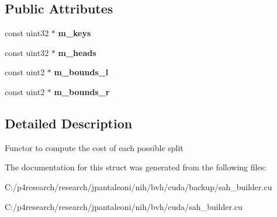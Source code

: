 \subsection*{\-Public \-Attributes}
\begin{DoxyCompactItemize}
\item 
\hypertarget{structnih_1_1cuda_1_1sah_1_1_cost__functor_a0342b4ecc5071a799c38c0c78210b16d}{
const uint32 $\ast$ {\bfseries m\-\_\-keys}}
\label{structnih_1_1cuda_1_1sah_1_1_cost__functor_a0342b4ecc5071a799c38c0c78210b16d}

\item 
\hypertarget{structnih_1_1cuda_1_1sah_1_1_cost__functor_a0d76a74ad352bc462b5e604b6560e917}{
const uint32 $\ast$ {\bfseries m\-\_\-heads}}
\label{structnih_1_1cuda_1_1sah_1_1_cost__functor_a0d76a74ad352bc462b5e604b6560e917}

\item 
\hypertarget{structnih_1_1cuda_1_1sah_1_1_cost__functor_ab0cd9dc0b011dd5689214b4d77c635a9}{
const uint2 $\ast$ {\bfseries m\-\_\-bounds\-\_\-l}}
\label{structnih_1_1cuda_1_1sah_1_1_cost__functor_ab0cd9dc0b011dd5689214b4d77c635a9}

\item 
\hypertarget{structnih_1_1cuda_1_1sah_1_1_cost__functor_ad345951b0d487eb2c5b05753bef1c7c9}{
const uint2 $\ast$ {\bfseries m\-\_\-bounds\-\_\-r}}
\label{structnih_1_1cuda_1_1sah_1_1_cost__functor_ad345951b0d487eb2c5b05753bef1c7c9}

\end{DoxyCompactItemize}


\subsection{\-Detailed \-Description}
\-Functor to compute the cost of each possible split 

\-The documentation for this struct was generated from the following files\-:\begin{DoxyCompactItemize}
\item 
\-C\-:/p4research/research/jpantaleoni/nih/bvh/cuda/backup/sah\-\_\-builder.\-cu\item 
\-C\-:/p4research/research/jpantaleoni/nih/bvh/cuda/sah\-\_\-builder.\-cu\end{DoxyCompactItemize}
